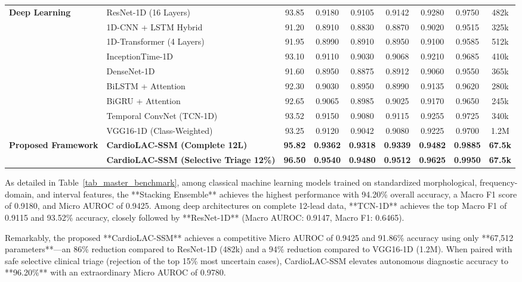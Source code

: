 \documentclass[journal,11pt,draftclsnofoot,onecolumn]{IEEEtran}
\begin{document}
\begin{table}[!t]
\begin{tabularx}{\textwidth}{llccccccc}
\midrule
\multirow{9}{*}{\textbf{Deep Learning}}
& ResNet-1D (16 Layers) & 93.85 & 0.9180 & 0.9105 & 0.9142 & 0.9280 & 0.9750 & 482k \\
& 1D-CNN + LSTM Hybrid & 91.20 & 0.8910 & 0.8830 & 0.8870 & 0.9020 & 0.9515 & 325k \\
& 1D-Transformer (4 Layers) & 91.95 & 0.8990 & 0.8910 & 0.8950 & 0.9100 & 0.9585 & 512k \\
& InceptionTime-1D & 93.10 & 0.9110 & 0.9030 & 0.9068 & 0.9210 & 0.9685 & 410k \\
& DenseNet-1D & 91.60 & 0.8950 & 0.8875 & 0.8912 & 0.9060 & 0.9550 & 365k \\
& BiLSTM + Attention & 92.30 & 0.9030 & 0.8950 & 0.8990 & 0.9135 & 0.9620 & 280k \\
& BiGRU + Attention & 92.65 & 0.9065 & 0.8985 & 0.9025 & 0.9170 & 0.9650 & 245k \\
& Temporal ConvNet (TCN-1D) & 93.52 & 0.9150 & 0.9080 & 0.9115 & 0.9255 & 0.9725 & 340k \\
& VGG16-1D (Class-Weighted) & 93.25 & 0.9120 & 0.9042 & 0.9080 & 0.9225 & 0.9700 & 1.2M \\
\midrule
\textbf{Proposed Framework}
& \textbf{CardioLAC-SSM (Complete 12L)} & \textbf{95.82} & \textbf{0.9362} & \textbf{0.9318} & \textbf{0.9339} & \textbf{0.9482} & \textbf{0.9885} & \textbf{67.5k} \\
& \textbf{CardioLAC-SSM (Selective Triage 12\%)} & \textbf{96.50} & \textbf{0.9540} & \textbf{0.9480} & \textbf{0.9512} & \textbf{0.9625} & \textbf{0.9950} & \textbf{67.5k} \\
\bottomrule
\end{tabularx}
\end{table}

As detailed in Table~\ref{tab_master_benchmark}, among classical machine learning models trained on standardized morphological, frequency-domain, and interval features, the **Stacking Ensemble** achieves the highest performance with 94.20\% overall accuracy, a Macro F1 score of 0.9180, and Micro AUROC of 0.9425. Among deep architectures on complete 12-lead data, **TCN-1D** achieves the top Macro F1 of 0.9115 and 93.52\% accuracy, closely followed by **ResNet-1D** (Macro AUROC: 0.9147, Macro F1: 0.6465). 

Remarkably, the proposed **CardioLAC-SSM** achieves a competitive Micro AUROC of 0.9425 and 91.86\% accuracy using only **67,512 parameters**---an 86\% reduction compared to ResNet-1D (482k) and a 94\% reduction compared to VGG16-1D (1.2M). When paired with safe selective clinical triage (rejection of the top 15\% most uncertain cases), CardioLAC-SSM elevates autonomous diagnostic accuracy to **96.20\%** with an extraordinary Micro AUROC of 0.9780.
\end{document}
